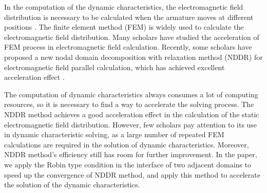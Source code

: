 \documentclass[journal,transmag]{IEEEtran}
\begin{document}
In the computation of the dynamic characteristics, the electromagnetic field distribution is necessary to be calculated when the armature moves at different positions \cite{IEEEhowto:You}. The finite element method (FEM) is widely used to calculate the electromagnetic field distribution. Many scholars have studied the acceleration of FEM process in electromagnetic field calculation. Recently, some scholars have proposed a new nodal domain decomposition with relaxation method (NDDR) for electromagnetic field parallel calculation, which has achieved excellent acceleration effect  \cite{IEEEhowto:Liu}.

The computation of dynamic characteristics always consumes a lot of computing resources, so it is necessary to find a way to accelerate the solving process. The NDDR method achieves a good acceleration effect in the calculation of the static electromagnetic field distribution. However, few scholars pay attention to its use in dynamic characteristic solving, as a large number of repeated FEM calculations are required in the solution of dynamic characteristics. Moreover, NDDR method's efficiency still has room for further improvement. In the paper, we apply the Robin type condition in the interface of two adjacent domains to speed up the convergence of NDDR method, and apply this method to accelerate the solution of the dynamic characteristics. 
\end{document}
